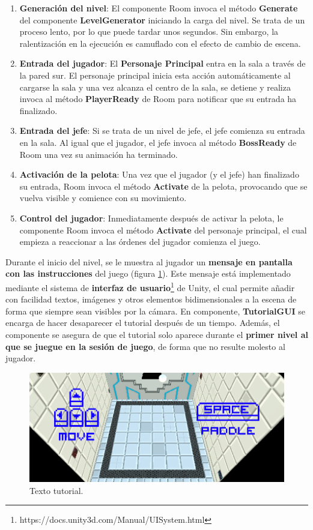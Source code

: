 \begin{enumerate}
\item \textbf{Generación del nivel}: El componente Room invoca el método \textbf{Generate} del componente \textbf{LevelGenerator} iniciando la carga del nivel. Se trata de un proceso lento, por lo que puede tardar unos segundos. Sin embargo, la ralentización en la ejecución es camuflado con el efecto de cambio de escena.
\item \textbf{Entrada del jugador}: El \textbf{Personaje Principal} entra en la sala a través de la pared sur. El personaje principal inicia esta acción automáticamente al cargarse la sala y una vez alcanza el centro de la sala, se detiene y realiza invoca al método \textbf{PlayerReady} de Room para notificar que su entrada ha finalizado.
\item \textbf{Entrada del jefe}: Si se trata de un nivel de jefe, el jefe comienza su entrada en la sala. Al igual que el jugador, el jefe invoca al método \textbf{BossReady} de Room una vez su animación ha terminado.
\item \textbf{Activación de la pelota}: Una vez que el jugador (y el jefe) han finalizado su entrada, Room invoca el método \textbf{Activate} de la pelota, provocando que se vuelva visible y comience con su movimiento. 
\item \textbf{Control del jugador}: Inmediatamente después de activar la pelota, le componente Room invoca el método \textbf{Activate} del personaje principal, el cual empieza a reaccionar a las órdenes del jugador comienza el juego.
\end{enumerate}

Durante el inicio del nivel, se le muestra al jugador un \textbf{mensaje en pantalla con las instrucciones} del juego (figura \ref{tutorial}). Este mensaje está implementado mediante el sistema de \textbf{interfaz de usuario}\footnote{https://docs.unity3d.com/Manual/UISystem.html} de Unity, el cual permite añadir con facilidad textos, imágenes y otros elementos bidimensionales a la escena de forma que siempre sean visibles por la cámara. En componente, \textbf{TutorialGUI} se encarga de hacer desaparecer el tutorial después de un tiempo. Además, el componente se asegura de que el tutorial solo aparece durante el \textbf{primer nivel al que se juegue en la sesión de juego}, de forma que no resulte molesto al jugador.
\begin{figure}[h]
	\includegraphics[width=1\textwidth]{images/estructura/niveles/tutorial}
	\centering
	\caption{Texto tutorial.}
	\label{tutorial}
\end{figure}

